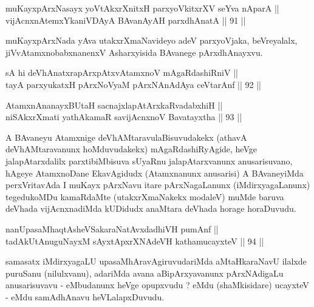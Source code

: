 \begin{shl}
muKayxpArxNasayx yoVtAkxrXnitxH parxyoVkitxrXV seYva nAparA || \\
\footnotemark[2]vijAcnxnAtemxYkaniVDAyA BAvanAyAH parxdhAnatA \hfill || 91 ||  
\end{shl}

\begin{artha}
muKayxpArxNada yAva utakxrXmaNavideyo adeV parxyoVjaka, beVreyalalx,
jiVvAtamxnobabxnanenxV Asharxyisida BAvanege pArxdhAnayxvu.
\end{artha}


\begin{shl}
sA hi deVhAnatxrapArxpAtxvAtamxnoV mAgaRdashiRniV || \\
tayA parxyukatxH pArxNoV\s yaM pArxNAnAdAya ceVtarAnf \hfill || 92 ||  
\end{shl}

\begin{shl}
AtamxnA\s nanayxBUtaH sacnajxlapAtArxkaRvadabxhiH || \\
niSAkxrXmati yathAkamaR savijAcnxnoV Bavatayxtha \hfill || 93 ||  
\end{shl}

\begin{artha}
A BAvaneyu Atamxnige deVhAMtaravulaBisuvudakekx (athavA
deVhAMtaravanunx hoMduvudakekx) mAgaRdashiRyAgide, heVge
jalapAtarxdalilx parxtibiMbisuva sUyaRnu jalapAtarxvanunx
anusarisuvano, hAgeye AtamxnoDane EkavAgidudx (Atamxnanunx anusarisi)
A BAvaneyiMda perxVritavAda I muKayx pArxNavu itare pArxNagaLanunx
(iMdirxyagaLanunx) tegedukoMDu kamaRdaMte (utakxrXmaNakekx modaleV)
muMde baruva deVhada vijAcnxnadiMda kUDidudx anaMtara deVhada horage
horaDuvudu.
\end{artha}

\begin{shl}
nanUpasaMhaqtAsheVSakaraNatAvxdadhiVH pumAnf || \\
tadAkUtAnuguNayxM sAyxtApxrXNAdeVH kathamucayxteV \hfill || 94 ||  
\end{shl}

\begin{artha}
samasatx iMdirxyagaLU upasaMhAravAgiruvudariMda aMtaHkaraNavU ilalxde
puruSanu (nilulxvanu), adariMda avana aBipArxyavanunx pArxNAdigaLu
anusarisuvavu - eMbudanunx heVge opupxvudu ? eMdu (shaMkisidare)
ucayxteV - eMdu samAdhAnavu heVLalapxDuvudu.
\end{artha}

